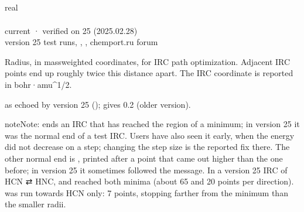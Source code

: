 \documentclass[letterpaper,10pt,english,openany,oneside]{sphinxmanual}
\begin{document}
\subsection{}
\label{\detokenize{reference/optimize:radius}}\label{\detokenize{reference/optimize:optimize-radius}}
\ignorespaces 
\sphinxAtStartPar
{} real\\
 \\
 current · verified on 25 (2025.02.28)\\
 version 25 test runs, , , chemport.ru forum

\sphinxAtStartPar
Radius, in mass\sphinxhyphen{}weighted coordinates, for IRC path optimization. Adjacent IRC points end up roughly twice
this distance apart. The IRC coordinate is reported in bohr·amu\textasciicircum{}1/2.

\sphinxAtStartPar
{}  as echoed by version 25 ();  gives 0.2 (older version).

\begin{sphinxadmonition}{note}{Note:}
\sphinxAtStartPar
{} ends an IRC that has reached the region of a minimum; in
version 25 it was the normal end of a test IRC. Users have also seen it early, when the energy did not
decrease on a step; changing the step size is the reported fix there. The other normal end is
, printed after a point that came out higher than the one before; in version
25 it sometimes followed the  message. In a version 25 IRC of HCN ⇄ HNC,  and 
reached both minima (about 65 and 20 points per direction).  was run towards HCN only: 7 points,
stopping farther from the minimum than the smaller radii.
\end{sphinxadmonition}
\end{document}
